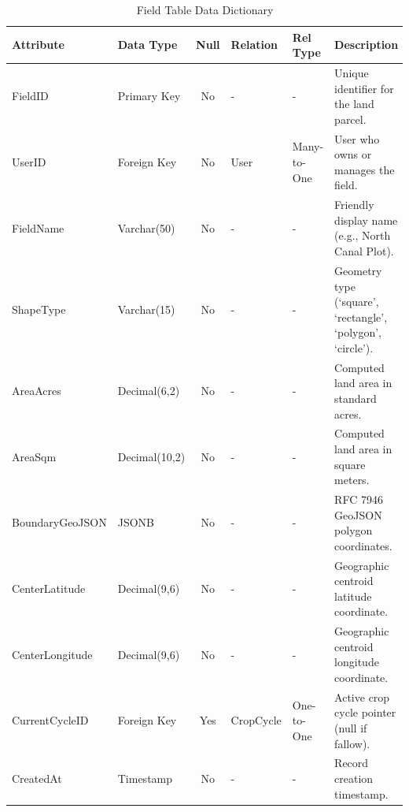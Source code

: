 \begin{table}[H]
\footnotesize
\centering
\caption{Field Table Data Dictionary}
\label{tab:field_table}
\begin{tabular}{|l|l|c|l|l|p{4.5cm}|}
\hline
\textbf{Attribute} & \textbf{Data Type} & \textbf{Null} & \textbf{Relation} & \textbf{Rel Type} & \textbf{Description} \\ \hline
FieldID & Primary Key & No & - & - & Unique identifier for the land parcel. \\ \hline
UserID & Foreign Key & No & User & Many-to-One & User who owns or manages the field. \\ \hline
FieldName & Varchar(50) & No & - & - & Friendly display name (e.g., North Canal Plot). \\ \hline
ShapeType & Varchar(15) & No & - & - & Geometry type (`square', `rectangle', `polygon', `circle'). \\ \hline
AreaAcres & Decimal(6,2) & No & - & - & Computed land area in standard acres. \\ \hline
AreaSqm & Decimal(10,2) & No & - & - & Computed land area in square meters. \\ \hline
BoundaryGeoJSON & JSONB & No & - & - & RFC 7946 GeoJSON polygon coordinates. \\ \hline
CenterLatitude & Decimal(9,6) & No & - & - & Geographic centroid latitude coordinate. \\ \hline
CenterLongitude & Decimal(9,6) & No & - & - & Geographic centroid longitude coordinate. \\ \hline
CurrentCycleID & Foreign Key & Yes & CropCycle & One-to-One & Active crop cycle pointer (null if fallow). \\ \hline
CreatedAt & Timestamp & No & - & - & Record creation timestamp. \\ \hline
\end{tabular}
\end{table}

